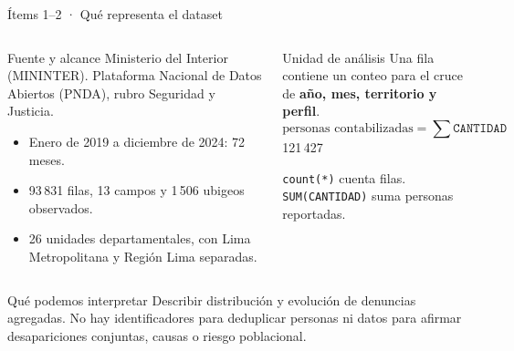 \begin{frame}[label=dataset]{Ítems 1--2 · Qué representa el dataset}
  \begin{columns}[T,onlytextwidth]
    \begin{block}{Fuente y alcance}
      \small Ministerio del Interior (MININTER). Plataforma Nacional de Datos Abiertos (PNDA),
      rubro Seguridad y Justicia.
      \begin{itemize}
        \item Enero de 2019 a diciembre de 2024: 72 meses.
        \item 93\,831 filas, 13 campos y 1\,506 ubigeos observados.
        \item 26 unidades departamentales, con Lima Metropolitana y Región Lima separadas.
      \end{itemize}
    \end{block}
    \begin{block}{Unidad de análisis}
      \small Una fila contiene un conteo para el cruce de \textbf{año, mes, territorio y perfil}.
      \[
        \text{personas contabilizadas}=\sum\texttt{CANTIDAD}
      \]
      \centering\alert{121\,427}\par
      \raggedright\vspace{4pt}
      \texttt{count(*)} cuenta filas. \texttt{SUM(CANTIDAD)} suma personas reportadas.
    \end{block}
  \end{columns}
  \begin{alertblock}{Qué podemos interpretar}
    \footnotesize Describir distribución y evolución de denuncias agregadas. No hay identificadores para
    deduplicar personas ni datos para afirmar desapariciones conjuntas, causas o riesgo poblacional.
  \end{alertblock}
\end{frame}

